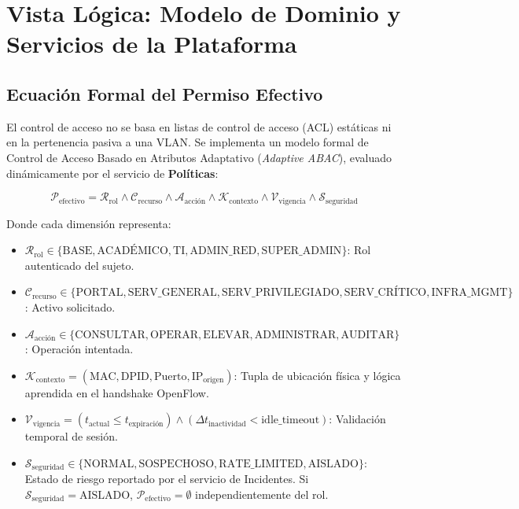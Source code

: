 \documentclass[11pt,a4paper]{report}
\begin{document}
\chapter{Vista Lógica: Modelo de Dominio y Servicios de la Plataforma}

\section{Ecuación Formal del Permiso Efectivo}
El control de acceso no se basa en listas de control de acceso (ACL) estáticas ni en la pertenencia pasiva a una VLAN. Se implementa un modelo formal de Control de Acceso Basado en Atributos Adaptativo (\emph{Adaptive ABAC}), evaluado dinámicamente por el servicio de \textbf{Políticas}:

\begin{equation}
\label{eq:abac}
\boxed{\mathcal{P}_{\text{efectivo}} = \mathcal{R}_{\text{rol}} \wedge \mathcal{C}_{\text{recurso}} \wedge \mathcal{A}_{\text{acción}} \wedge \mathcal{K}_{\text{contexto}} \wedge \mathcal{V}_{\text{vigencia}} \wedge \mathcal{S}_{\text{seguridad}}}
\end{equation}

Donde cada dimensión representa:
\begin{itemize}[leftmargin=*]
    \item $\mathcal{R}_{\text{rol}} \in \{\text{BASE}, \text{ACADÉMICO}, \text{TI}, \text{ADMIN\_RED}, \text{SUPER\_ADMIN}\}$: Rol autenticado del sujeto.
    \item $\mathcal{C}_{\text{recurso}} \in \{\text{PORTAL}, \text{SERV\_GENERAL}, \text{SERV\_PRIVILEGIADO}, \text{SERV\_CRÍTICO}, \text{INFRA\_MGMT}\}$: Activo solicitado.
    \item $\mathcal{A}_{\text{acción}} \in \{\text{CONSULTAR}, \text{OPERAR}, \text{ELEVAR}, \text{ADMINISTRAR}, \text{AUDITAR}\}$: Operación intentada.
    \item $\mathcal{K}_{\text{contexto}} = (\text{MAC}, \text{DPID}, \text{Puerto}, \text{IP}_{\text{origen}})$: Tupla de ubicación física y lógica aprendida en el handshake OpenFlow.
    \item $\mathcal{V}_{\text{vigencia}} = (t_{\text{actual}} \le t_{\text{expiración}}) \wedge (\Delta t_{\text{inactividad}} < \text{idle\_timeout})$: Validación temporal de sesión.
    \item $\mathcal{S}_{\text{seguridad}} \in \{\text{NORMAL}, \text{SOSPECHOSO}, \text{RATE\_LIMITED}, \text{AISLADO}\}$: Estado de riesgo reportado por el servicio de Incidentes. Si $\mathcal{S}_{\text{seguridad}} = \text{AISLADO}$, $\mathcal{P}_{\text{efectivo}} = \emptyset$ independientemente del rol.
\end{itemize}
\end{document}
